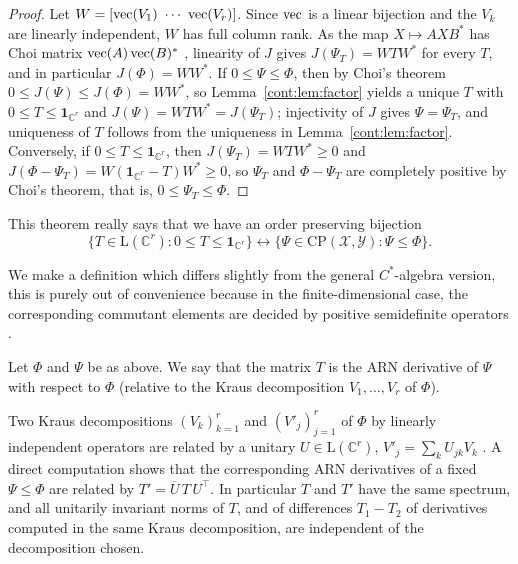 \begin{proof}
Let $W=[\vectorise(V_1)\ \cdots\ \vectorise(V_r)]$. Since $\operatorname{vec}$ is a linear bijection and the $V_k$ are
linearly independent, $W$ has full column rank. As the map $X\mapsto AXB^*$ has Choi matrix $\operatorname{vec}(A)\operatorname{vec}(B)^*$ \cite[Section~2.2.2]{watrous2018theory},
linearity of $J$ gives $J(\Psi_T)=WTW^*$ for every $T$, and in particular $J(\Phi)=WW^*$. If $0\leq\Psi\leq\Phi$, then by Choi's
theorem \cite{Choi1975} $0\leq J(\Psi)\leq J(\Phi)=WW^*$, so Lemma~\ref{cont:lem:factor} yields a unique $T$ with $0\leq T\leq\mathbf{1}_{\mathbb{C}^r}$ and
$J(\Psi)=WTW^*=J(\Psi_T)$; injectivity of $J$ gives $\Psi=\Psi_T$, and uniqueness of $T$ follows from the uniqueness in
Lemma~\ref{cont:lem:factor}. Conversely, if $0\leq T\leq\mathbf{1}_{\mathbb{C}^r}$, then $J(\Psi_T)=WTW^*\geq0$ and $J(\Phi-\Psi_T)=W(\mathbf{1}_{\mathbb{C}^r}-T)W^*\geq0$,
so $\Psi_T$ and $\Phi-\Psi_T$ are completely positive by Choi's theorem, that is, $0\leq\Psi_T\leq\Phi$.
\end{proof}
This theorem really says that we have an order preserving bijection
\[
    \{T\in \mathrm{L}(\mathbb{C}^r):0\leq T\leq \mathbf{1}_{\mathbb{C}^r}\}\leftrightarrow \{\Psi \in \mathrm{CP}(\mathcal{X},\mathcal{Y}):\Psi\leq \Phi\}.
\]
 
We make a definition which differs slightly from the general $C^*$-algebra version, this is purely out of convenience because in the finite-dimensional case, the corresponding commutant elements are decided by positive semidefinite operators \cite{Okayasu2026}. 
\begin{definition}
    Let $\Phi$ and $\Psi$ be as above. We say that the matrix $T$ is the ARN derivative of $\Psi$ with respect to $\Phi$ (relative to the Kraus decomposition $V_1,\dots,V_r$ of $\Phi$). 
\end{definition}
 
\begin{remark}
    Two Kraus decompositions $(V_k)_{k=1}^r$ and $(V'_j)_{j=1}^r$ of $\Phi$ by linearly independent operators are related by a unitary $U\in \mathrm{L}(\mathbb{C}^r)$, $V'_j=\sum_k U_{jk}V_k$ \cite[Section~2.2.2]{watrous2018theory}. A direct computation shows that the corresponding ARN derivatives of a fixed $\Psi\leq\Phi$ are related by $T'=\overline{U}\,T\,U^\top$. In particular $T$ and $T'$ have the same spectrum, and all unitarily invariant norms of $T$, and of differences $T_1-T_2$ of derivatives computed in the same Kraus decomposition, are independent of the decomposition chosen. 
\end{remark}

